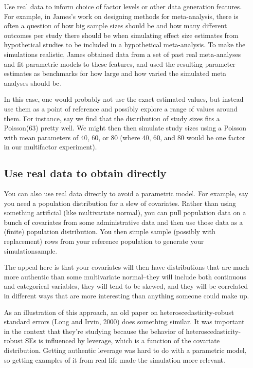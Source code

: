 \documentclass[
]{book}
\begin{document}
Use real data to inform choice of factor levels or other data generation features.
For example, in James's work on designing methods for meta-analysis, there is often a question of how big sample sizes should be and how many different outcomes per study there should be when simulating effect size estimates from hypothetical studies to be included in a hypothetical meta-analysis.
To make the simulations realistic, James obtained data from a set of past real meta-analyses and fit parametric models to these features, and used the resulting parameter estimates as benchmarks for how large and how varied the simulated meta analyses should be.

In this case, one would probably not use the exact estimated values, but instead use them as a point of reference and possibly explore a range of values around them.
For instance, say we find that the distribution of study sizes fits a Poisson(63) pretty well.
We might then then simulate study sizes using a Poisson with mean parameters of 40, 60, or 80 (where 40, 60, and 80 would be one factor in our multifactor experiment).

\subsection{Use real data to obtain directly}\label{use-real-data-to-obtain-directly}

You can also use real data directly to avoid a parametric model.
For example, say you need a population distribution for a slew of covariates.
Rather than using something artificial (like multivariate normal), you can pull population data on a bunch of covariates from some administrative data and then use those data as a (finite) population distribution.
You then simple sample (possibly with replacement) rows from your reference population to generate your simulationsample.

The appeal here is that your covariates will then have distributions that are much more authentic than some multivariate normal--they will include both continuous and categorical variables, they will tend to be skewed, and they will be correlated in different ways that are more interesting than anything someone could make up.

As an illustration of this approach, an old paper on heteroscedasticity-robust standard errors (Long and Irvin, 2000) does something similar.
It was important in the context that they're studying because the behavior of heteroscedasticity-robust SEs is influenced by leverage, which is a function of the covariate distribution.
Getting authentic leverage was hard to do with a parametric model, so getting examples of it from real life made the simulation more relevant.
\end{document}

